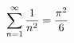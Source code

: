 \documentclass[preview]{standalone}
\begin{document}
\begin{align*}
\special{dvisvgm:raw <g id='unique000'>}\sum_{n=1}^\infty \frac{1}{n^2} = \frac{\pi^2}{6}\special{dvisvgm:raw </g>}
\end{align*}
\end{document}
